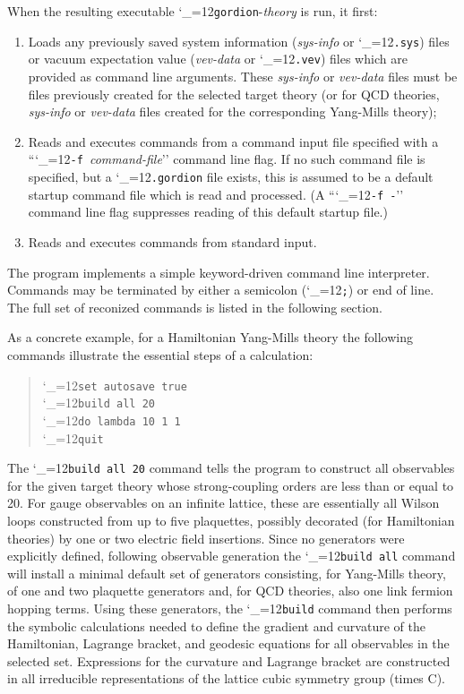 \documentclass [12pt]{article}
\makeatletter
\renewcommand{\tt}{\begingroup\catcode`_=12\def\_{\string_}\tt@}
\newcommand{\tt@}[1]{\texttt{#1}\endgroup}
\makeatother
\begin{document}
When the resulting executable \tt{gordion}-\textit{theory} is run, it first:
\begin{enumerate}
\item
    Loads any previously saved system information
    (\textit{sys-info} or \tt{.sys}) files or 
    vacuum expectation value (\textit{vev-data} or \tt{.vev}) files
    which are provided as command line arguments.
    These \textit{sys-info} or \textit{vev-data} files must
    be files previously created for the selected target theory
    (or for QCD theories, \textit{sys-info} or \textit{vev-data} files
    created for the corresponding Yang-Mills theory);
\item
    Reads and executes commands from a command input file 
    specified with a ``\tt{-f }\textit{command-file}'' command line flag.
    If no such command file is specified, but a \tt{.gordion}
    file exists, this is assumed to be a default startup command file
    which is read and processed.
    (A ``\tt{-f -}'' command line flag suppresses reading of this
    default startup file.)
\item
    Reads and executes commands from standard input.
\end{enumerate}

The program implements a simple keyword-driven command line interpreter.
Commands may be terminated by either a semicolon (\tt{;}) or end of line.
The full set of reconized commands is listed in the following section.

As a concrete example, for a Hamiltonian Yang-Mills theory
the following commands
illustrate the essential steps of a calculation:
\begin{quote}
  \tt{set autosave true}
\\\tt{build all 20}
\\\tt{do lambda 10 1 1}
\\\tt{quit}
\end{quote}
%
The \tt{build all 20} command tells the program to construct all observables
for the given target theory whose strong-coupling orders are less than or equal to 20.
For gauge observables on an infinite lattice, these are essentially all
Wilson loops constructed from up to five plaquettes, possibly
decorated (for Hamiltonian theories) by one or two electric field insertions.
Since no generators were explicitly defined,
following observable generation
the \tt{build all} command will install a minimal default
set of generators consisting, for Yang-Mills theory,
of one and two plaquette generators and, for QCD theories, also
one link fermion hopping terms.
Using these generators, the \tt{build} command then
performs the symbolic calculations needed to define the
gradient and curvature of the Hamiltonian, Lagrange bracket,
and geodesic equations for all observables in the selected set.
Expressions for the curvature and Lagrange bracket are constructed
in all irreducible representations of the lattice cubic symmetry group (times C).
\end{document}
